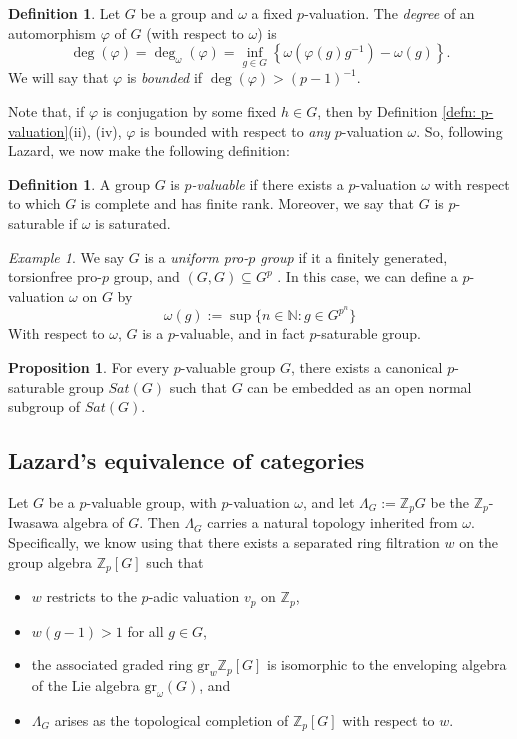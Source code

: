 \documentclass[12pt,a4paper]{article}
\makeatletter
\newcommand*{\rom}[1]{\expandafter\@slowromancap\romannumeral #1@}
\theoremstyle{definition}
\newtheorem{defn}[thm]{Definition}
\newtheorem{propn}[thm]{Proposition}
\theoremstyle{remark}
\newtheorem{ex}[thm]{Example}
\theoremstyle{custthm}
\newcommand{\gr}{\mathrm{gr}}
\makeatother
\begin{document}
\begin{defn}\cite[Definition 4.5]{ardakovInv}
Let $G$ be a group and $\omega$ a fixed $p$-valuation. The \emph{degree} of an automorphism $\varphi$ of $G$ (with respect to $\omega$) is
$$\deg(\varphi) = \deg_\omega(\varphi) = \inf_{g\in G} \left\{ \omega(\varphi(g)g^{-1}) - \omega(g) \right\}.$$
We will say that $\varphi$ is \emph{bounded} if $\deg(\varphi) > (p-1)^{-1}$.
\end{defn}

Note that, if $\varphi$ is conjugation by some fixed $h\in G$, then by Definition \ref{defn: p-valuation}(ii), (iv), $\varphi$ is bounded with respect to \emph{any} $p$-valuation $\omega$. So, following Lazard, we now make the following definition:

\begin{defn}\label{defn: p-valuable}
\cite[Ch. III, Definition 3.1.6]{Laz65}
A group $G$ is \emph{$p$-valuable} if there exists a $p$-valuation $\omega$ with respect to which $G$ is complete and has finite rank. Moreover, we say that $G$ is $p$-saturable if $\omega$ is saturated.
\end{defn}

\begin{ex}\label{uniform}
We say $G$ is a \emph{uniform pro-$p$ group} if it a finitely generated, torsionfree pro-$p$ group, and $(G,G)\subseteq G^p$ \cite[Definition 4.1 and Theorem 4.5]{ddms}. In this case, we can define a $p$-valuation $\omega$ on $G$ by $$\omega(g):=\sup\{n\in\mathbb{N}:g\in G^{p^n}\}$$ With respect to $\omega$, $G$ is a $p$-valuable, and in fact $p$-saturable group.
\end{ex}

\begin{propn}
\cite[\rom{3}.3.3]{Laz65}
For every $p$-valuable group $G$, there exists a canonical $p$-saturable group $Sat(G)$ such that $G$ can be embedded as an open normal subgroup of $Sat(G)$.
\end{propn}

\subsection{Lazard's equivalence of categories}

Let $G$ be a $p$-valuable group, with $p$-valuation $\omega$, and let $\Lambda_G:=\mathbb{Z}_p G$ be the $\mathbb{Z}_p$-Iwasawa algebra of $G$. Then $\Lambda_G$ carries a natural topology inherited from $\omega$. Specifically, we know using \cite[\rom{3}.2.3.6]{Laz65} that there exists a separated ring filtration $w$ on the group algebra $\mathbb{Z}_p[G]$ such that 
\begin{itemize}
\item $w$ restricts to the $p$-adic valuation $v_p$ on $\mathbb{Z}_p$,
\item $w(g-1)>1$ for all $g\in G$,
\item the associated graded ring $\gr_w\mathbb{Z}_p[G]$ is isomorphic to the enveloping algebra of the Lie algebra $\gr_\omega(G)$, and 
\item $\Lambda_G$ arises as the topological completion of $\mathbb{Z}_p[G]$ with respect to $w$.
\end{itemize}
\end{document}
